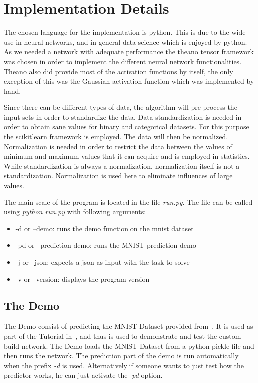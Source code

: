\documentclass{article}
\begin{document}
\section{Implementation Details}
\label{sec:implementation_details}

The chosen language for the implementation is python. This is due to the wide use in neural networks, and in general data-science which is enjoyed by python. As we needed a network with adequate performance the theano tensor framework was chosen in order to implement the different neural network functionalities. Theano also did provide most of the activation functions by itself, the only exception of this was the Gaussian activation function which was implemented by hand.


Since there can be different types of data, the algorithm will pre-process the input sets in order to standardize the data. Data standardization is needed in order to obtain sane values for binary and categorical datasets. For this purpose the scikitlearn framework is employed. The data will then be normalized. Normalization is needed in order to restrict the data between the values of minimum and maximum values that it can acquire and is employed in statistics. While standardization is always a normalization, normalization itself is not a standardization. Normalization is used here to eliminate influences of large values. 

The main scale of the program is located in the file \textit{run.py}. The file can be called using \textit{python run.py} with following arguments:
\begin{itemize}
    \item -d or --demo: runs the demo function on the mnist dataset
    \item -pd or --prediction-demo: runs the MNIST prediction demo 
    \item -j or --json: expects a json as input with the task to solve
    \item -v or --version: displays the program version
\end{itemize}
\subsection{The Demo}
The Demo consist of predicting the MNIST Dataset provided from~\cite{MNISTSite}. It is used as part of the Tutorial in~\cite{deepLearning.org}, and thus is used to demonstrate and test the custom build network. The Demo loads the MNIST Dataset from a python pickle file and then runs the network. The prediction part of the demo is run automatically when the prefix \emph{-d} is used. Alternatively if someone wants to just test how the predictor works, he can just activate the \emph{-pd} option.
\end{document}
